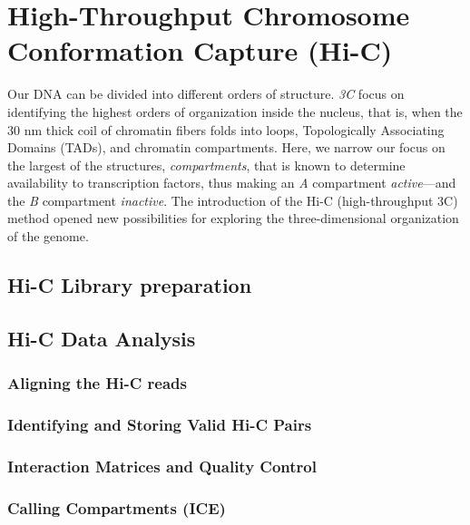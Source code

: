 \documentclass[
  11pt,
  a4paper,
]{scrbook}
\let\oldemph\emph
\renewcommand\emph[1]{\oldemph{\color{gray}#1}}
\begin{document}
\section{High-Throughput Chromosome Conformation Capture
(Hi-C)}\label{high-throughput-chromosome-conformation-capture-hi-c}

Our DNA can be divided into different orders of structure. \emph{3C}
focus on identifying the highest orders of organization inside the
nucleus, that is, when the 30 nm thick coil of chromatin fibers folds
into loops, Topologically Associating Domains (TADs), and chromatin
compartments. Here, we narrow our focus on the largest of the
structures, \emph{compartments}, that is known to determine availability
to transcription factors, thus making an \emph{A} compartment
\emph{active}---and the \emph{B} compartment \emph{inactive}. The
introduction of the Hi-C (high-throughput 3C) method
\citep{lieberman_aiden_comprehensive_2009} opened new possibilities for
exploring the three-dimensional organization of the genome.

\subsection{Hi-C Library preparation}\label{hi-c-library-preparation}

\subsection{Hi-C Data Analysis}\label{hi-c-data-analysis}

\subsubsection{Aligning the Hi-C reads}\label{aligning-the-hi-c-reads}

\subsubsection{Identifying and Storing Valid Hi-C
Pairs}\label{identifying-and-storing-valid-hi-c-pairs}

\subsubsection{Interaction Matrices and Quality
Control}\label{interaction-matrices-and-quality-control}

\subsubsection{Calling Compartments
(ICE)}\label{calling-compartments-ice}
\end{document}
